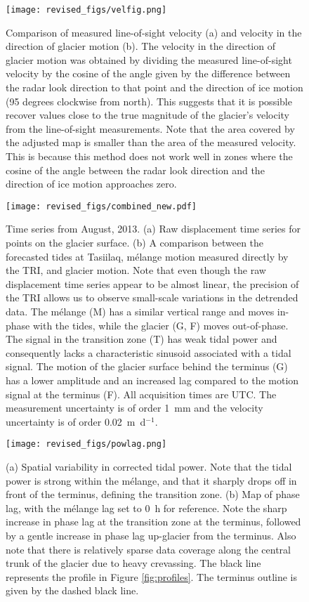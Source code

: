 \documentclass[review]{igs}
\begin{document}
\begin{figure}
\centering
\texttt{[image: revised\_figs/velfig.png]}
\caption{Comparison of measured line-of-sight velocity (a) and velocity in the direction of glacier motion (b). The velocity in the direction of glacier motion was obtained by dividing the measured line-of-sight velocity by the cosine of the angle given by the difference between the radar look direction to that point and the direction of ice motion (95 degrees clockwise from north). This suggests that it is possible recover values close to the true magnitude of the glacier's velocity from the line-of-sight measurements. Note that the area covered by the adjusted map is smaller than the area of the measured velocity. This is because this method does not work well in zones where the cosine of the angle between the radar look direction and the direction of ice motion approaches zero.}
\label{fig:velocities}
\end{figure}


\begin{figure}
\centering
\texttt{[image: revised\_figs/combined\_new.pdf]}
\caption{Time series from August, 2013. (a) Raw displacement time series for points on the glacier surface. (b) A comparison between the forecasted tides at Tasiilaq, m\'elange motion measured directly by the TRI, and glacier motion. Note that even though the raw displacement time series appear to be almost linear, the precision of the TRI allows us to observe small-scale variations in the detrended data. The m\'elange (M) has a similar vertical range and moves in-phase with the tides, while the glacier  (G, F) moves out-of-phase. The signal in the transition zone (T) has weak tidal power and consequently lacks a characteristic sinusoid associated with a tidal signal. The motion of the glacier surface behind the terminus (G) has a lower amplitude and an increased lag compared to the motion signal at the terminus (F). All acquisition times are UTC. The measurement uncertainty is of order 1~mm and the velocity uncertainty is of order 0.02~m~d$^{-1}$. }
\label{fig:transition}
\end{figure}

\begin{figure}
\centering
\texttt{[image: revised\_figs/powlag.png]}
\caption{(a) Spatial variability in corrected tidal power. Note that the tidal power is strong within the m\'elange, and that it sharply drops off in front of the terminus, defining the transition zone. (b) Map of phase lag, with the m\'elange lag set to 0~h for reference. Note the sharp increase in phase lag at the  transition zone at the terminus, followed by a gentle increase in phase lag up-glacier from the terminus. Also note that there is relatively sparse data coverage along the central trunk of the glacier due to heavy crevassing. The black line represents the profile in Figure \ref{fig:profiles}. The terminus outline is given by the dashed black line.}
\label{fig:maps}
\end{figure}
\end{document}
